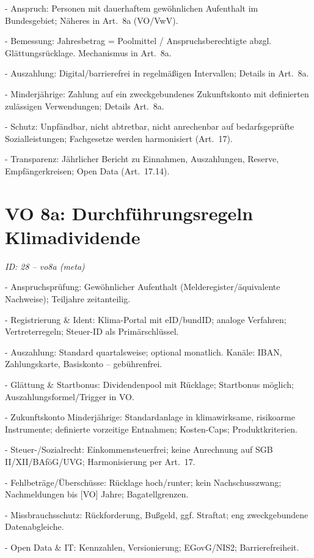 \documentclass[12pt,a4paper]{scrartcl}
\begin{document}
- Anspruch: Personen mit dauerhaftem gewöhnlichen Aufenthalt im Bundesgebiet; Näheres in Art. 8a (VO/VwV).

- Bemessung: Jahresbetrag = Poolmittel / Anspruchsberechtigte abzgl. Glättungsrücklage. Mechanismus in Art. 8a.

- Auszahlung: Digital/barrierefrei in regelmäßigen Intervallen; Details in Art. 8a.

- Minderjährige: Zahlung auf ein zweckgebundenes Zukunftskonto mit definierten zulässigen Verwendungen; Details Art. 8a.

- Schutz: Unpfändbar, nicht abtretbar, nicht anrechenbar auf bedarfsgeprüfte Sozialleistungen; Fachgesetze werden harmonisiert (Art. 17).

- Transparenz: Jährlicher Bericht zu Einnahmen, Auszahlungen, Reserve, Empfängerkreisen; Open Data (Art. 17.14).


\section[VO 8a: Durchführungsregeln Klimadividende]{VO 8a: Durchführungsregeln Klimadividende}
\noindent\textit{ID: 28 -- vo8a (meta)}

- Anspruchsprüfung: Gewöhnlicher Aufenthalt (Melderegister/äquivalente Nachweise); Teiljahre zeitanteilig.

- Registrierung \& Ident: Klima-Portal mit eID/bundID; analoge Verfahren; Vertreterregeln; Steuer-ID als Primärschlüssel.

- Auszahlung: Standard quartalsweise; optional monatlich. Kanäle: IBAN, Zahlungskarte, Basiskonto -- gebührenfrei.

- Glättung \& Startbonus: Dividendenpool mit Rücklage; Startbonus möglich; Auszahlungsformel/Trigger in VO.

- Zukunftskonto Minderjährige: Standardanlage in klimawirksame, risikoarme Instrumente; definierte vorzeitige Entnahmen; Kosten-Caps; Produktkriterien.

- Steuer-/Sozialrecht: Einkommensteuerfrei; keine Anrechnung auf SGB II/XII/BAföG/UVG; Harmonisierung per Art. 17.

- Fehlbeträge/Überschüsse: Rücklage hoch/runter; kein Nachschusszwang; Nachmeldungen bis [VO] Jahre; Bagatellgrenzen.

- Missbrauchsschutz: Rückforderung, Bußgeld, ggf. Straftat; eng zweckgebundene Datenabgleiche.

- Open Data \& IT: Kennzahlen, Versionierung; EGovG/NIS2; Barrierefreiheit.
\end{document}
